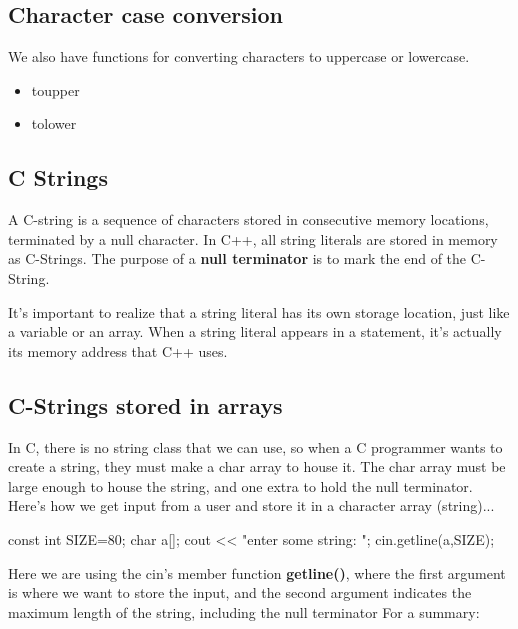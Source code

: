 \documentclass{report}
\begin{document}
    \bigbreak \noindent 
    \subsection{Character case conversion}
    \bigbreak \noindent 
    We also have functions for converting characters to uppercase or lowercase.
    \begin{itemize}
        \item toupper
        \item tolower
    \end{itemize}

    \bigbreak \noindent 
    \subsection{C Strings }
    \bigbreak \noindent 
    \begin{concept}
 A C-string is a sequence of characters stored in consecutive memory locations, terminated by a null character. In C++, all string literals are stored in memory as C-Strings. The purpose of  a \textbf{null terminator} is to mark the end of the C-String.
	\end{concept}
    \bigbreak \noindent 
    It's important to realize that a string literal has its own storage location, just like a variable or an array. When a string literal appears in a statement, it's actually its memory address that C++ uses. 

    \pagebreak
    \subsection{C-Strings stored in arrays}
    \bigbreak \noindent 
    In C, there is no string class that we can use, so when a C programmer wants to create a string, they must make a char array to house it. The char array must be large enough to house the string, and one extra to hold the null terminator.
    \bigbreak \noindent 
    Here's how we get input from a user and store it in a character array (string)...
    \bigbreak \noindent 
    
    \begin{cppcode}
const int SIZE=80;
char a[];
cout << "enter some string: ";
cin.getline(a,SIZE);
    \end{cppcode}
    
    \bigbreak \noindent 
    Here we are using the cin's member function \textbf{getline()}, where the first argument is where we want to store the input, and the second argument indicates the maximum length of the string, including the null terminator
    \bigbreak \noindent 
    For a summary:
    \bigbreak \noindent 
    
\end{document}
